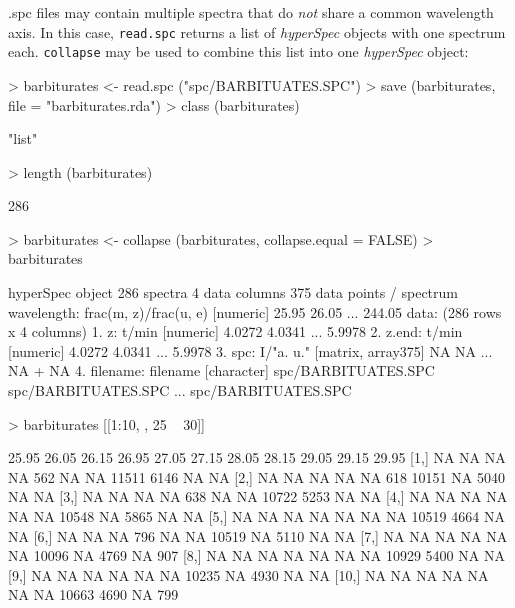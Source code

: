 \documentclass[english, a4paper, 10pt, headings=small, DIV11]{scrartcl}
\renewenvironment{Schunk}{\vspace{0pt}\begin{small}}{\end{small}\vspace{0pt}}
\newcommand{\Rfunction}[2][]{\texorpdfstring{\nohyphens{#1\texttt{#2}}}{#2}}
\newcommand{\Rclass}[1]{\texorpdfstring{\nohyphens{\textit{#1}}}{#1}}
\newcommand{\chy}{\Rclass{hyperSpec}\xspace}
\begin{document}
.spc files may contain multiple spectra that do \emph{not} share a common wavelength axis. In this
case, \Rfunction{read.spc} returns a list of \chy objects with one spectrum
each. \Rfunction{collapse} may be used to combine this list into one \chy object:
\begin{Schunk}
\begin{Sinput}
> barbiturates <- read.spc ("spc/BARBITUATES.SPC")
> save (barbiturates, file = "barbiturates.rda")
> class (barbiturates)
\end{Sinput}
\begin{Soutput}
[1] "list"
\end{Soutput}
\begin{Sinput}
> length (barbiturates)
\end{Sinput}
\begin{Soutput}
[1] 286
\end{Soutput}
\begin{Sinput}
> barbiturates <- collapse (barbiturates, collapse.equal = FALSE)
> barbiturates
\end{Sinput}
\begin{Soutput}
hyperSpec object
   286 spectra
   4 data columns
   375 data points / spectrum
wavelength: frac(m, z)/frac(u, e) [numeric] 25.95 26.05 ... 244.05 
data:  (286 rows x 4 columns)
   1. z: t/min [numeric] 4.0272 4.0341 ... 5.9978 
   2. z.end: t/min [numeric] 4.0272 4.0341 ... 5.9978 
   3. spc: I/"a. u." [matrix, array375] NA NA ... NA + NA
   4. filename: filename [character] spc/BARBITUATES.SPC spc/BARBITUATES.SPC ... spc/BARBITUATES.SPC 
\end{Soutput}
\begin{Sinput}
> barbiturates [[1:10, , 25 ~ 30]]
\end{Sinput}
\begin{Soutput}
      25.95 26.05 26.15 26.95 27.05 27.15 28.05 28.15 29.05 29.15 29.95
 [1,]    NA    NA    NA    NA   562    NA    NA 11511  6146    NA    NA
 [2,]    NA    NA    NA    NA    NA   618 10151    NA  5040    NA    NA
 [3,]    NA    NA    NA    NA   638    NA    NA 10722  5253    NA    NA
 [4,]    NA    NA    NA    NA    NA    NA 10548    NA  5865    NA    NA
 [5,]    NA    NA    NA    NA    NA    NA    NA 10519  4664    NA    NA
 [6,]    NA    NA    NA   796    NA    NA 10519    NA  5110    NA    NA
 [7,]    NA    NA    NA    NA    NA    NA 10096    NA  4769    NA   907
 [8,]    NA    NA    NA    NA    NA    NA    NA 10929  5400    NA    NA
 [9,]    NA    NA    NA    NA    NA    NA 10235    NA  4930    NA    NA
[10,]    NA    NA    NA    NA    NA    NA    NA 10663  4690    NA   799
\end{Soutput}
\end{Schunk}
\end{document}
